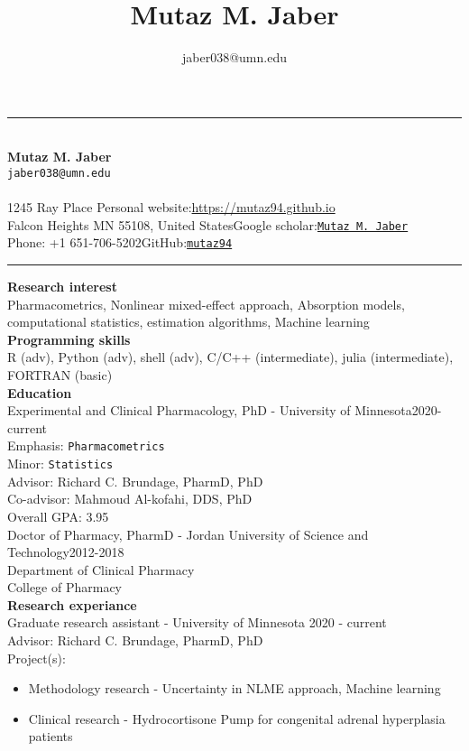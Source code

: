 \documentclass[a4paper,11pt]{article}
\title{\LARGE\bfseries Mutaz M. \textbf{Jaber}}
\author{jaber038@umn.edu}
\date{}
\begin{document}
\rule{\textwidth}{1pt}
~\\[0.5cm]
{\centering\textbf{\LARGE Mutaz M. Jaber}\\[0.1cm] \texttt{jaber038@umn.edu} \\[-0.2cm]}
~\\[0.1cm]
1245 Ray Place \hfill Personal website:\href{https://mutaz94.github.io/}{https://mutaz94.github.io}\\
Falcon Heights MN 55108, United States\hfill Google scholar:\href{https://scholar.google.com/citations?user=uugc-IgAAAAJ&hl=en&authuser=1}{\texttt{Mutaz M. Jaber}}\\
Phone: +1 651-706-5202\hfill GitHub:\href{https://github.com/Mutaz94}{\texttt{mutaz94}}\\
\rule{\textwidth}{1pt}

\textbf{Research interest}\\
Pharmacometrics, Nonlinear mixed-effect approach, Absorption models, computational statistics, estimation algorithms, Machine learning\\
\textbf{Programming skills}\\
R (adv), Python (adv), shell (adv), C/C++ (intermediate), julia (intermediate), FORTRAN (basic)\\
\textbf{Education}\\[-0.3cm]

Experimental and Clinical Pharmacology, PhD - University of Minnesota\hfill 2020-current\\
Emphasis: \texttt{Pharmacometrics}\\
Minor: \texttt{Statistics}\\
Advisor: Richard C. Brundage, PharmD, PhD\\
Co-advisor: Mahmoud Al-kofahi, DDS, PhD\\
Overall GPA: 3.95\\[0.5cm]

Doctor of Pharmacy, PharmD - Jordan University of Science and Technology\hfill 2012-2018\\
Department of Clinical Pharmacy\\
College of Pharmacy\\[1cm]

\textbf{Research experiance}\\[-0.3cm]


Graduate research assistant - University of Minnesota \hfill 2020 - current \\
Advisor: Richard C. Brundage, PharmD, PhD \\
Project(s): 
\begin{itemize}
\item Methodology research - Uncertainty in NLME approach, Machine learning 
\item Clinical research - Hydrocortisone Pump for congenital adrenal hyperplasia patients
\end{itemize}
\end{document}
